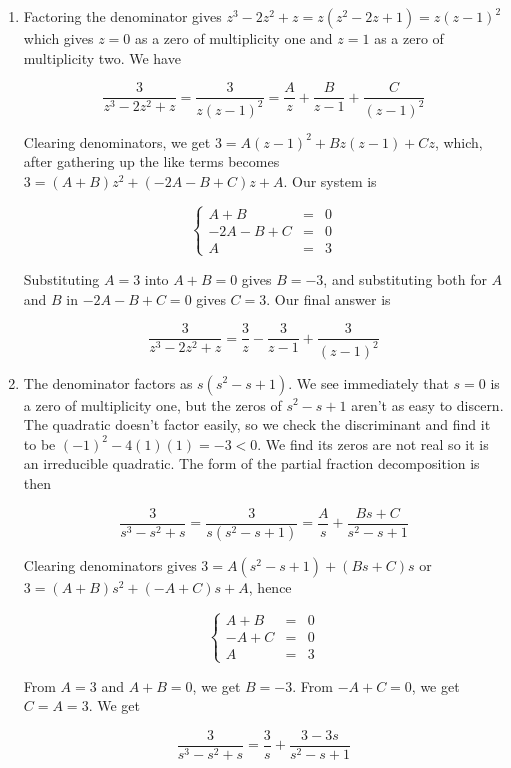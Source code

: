 \documentclass{ximera}
\begin{document}
\begin{example}
\begin{enumerate}
\[\frac{x+5}{2x^2-x-1} = \frac{2}{x-1} -\frac{3}{2x+1} \]

\item  Factoring the denominator gives $z^3-2z^2+z = z\left(z^2-2z+1\right) = z(z-1)^2$ which gives $z=0$ as a zero of multiplicity one and $z=1$ as a zero of multiplicity two. We have

\[ \frac{3}{z^3-2z^2+z} = \frac{3}{z(z-1)^2} = \frac{A}{z} + \frac{B}{z-1} + \frac{C}{(z-1)^2} \]

Clearing denominators, we get $3 = A(z-1)^2 + Bz(z-1)+Cz$, which, after gathering up the like terms becomes $3 = (A+B)z^2+(-2A-B+C)z + A$.  Our system is 
 
\[ \left\{ \begin{array}{rcr}  A+B & = & 0 \\ -2A-B+C & = & 0 \\ A & = & 3 \end{array} \right.\]

Substituting $A=3$ into $A+B = 0$ gives $B = -3$, and substituting both for $A$ and $B$ in $-2A-B+C = 0$ gives $C = 3$.  Our final answer is

\[ \frac{3}{z^3-2z^2+z} = \frac{3}{z} - \frac{3}{z-1} + \frac{3}{(z-1)^2} \]

\item  The denominator factors as $s\left(s^2-s+1\right)$.  We see immediately that $s=0$ is a zero of multiplicity one, but the zeros of $s^2-s+1$ aren't as easy to discern.  The quadratic doesn't factor easily, so we check the discriminant and find it to be $(-1)^2-4(1)(1) = -3 < 0$.  We find its zeros are not real so it is an irreducible quadratic.  The form of the partial fraction decomposition is then

\[\frac{3}{s^3-s^2+s} = \frac{3}{s\left(s^2-s+1\right)} = \frac{A}{s} + \frac{Bs+C}{s^2-s+1}\]

Clearing denominators gives $3 = A\left(s^2-s+1\right) + (Bs+C)s$ or $3 = (A+B)s^2 + (-A+C)s +A$, hence

\[ \left\{ \begin{array}{rcr}  A+B & = & 0 \\ -A+C & = & 0 \\ A & = & 3 \end{array} \right.\]

From $A=3$ and $A+B = 0$, we get $B = -3$.  From $-A+C = 0$, we get $C = A = 3$.  We get


\[\frac{3}{s^3-s^2+s} =  \frac{3}{s} + \frac{3-3s}{s^2-s+1}\]


\end{enumerate}
\end{example}
\end{document}
